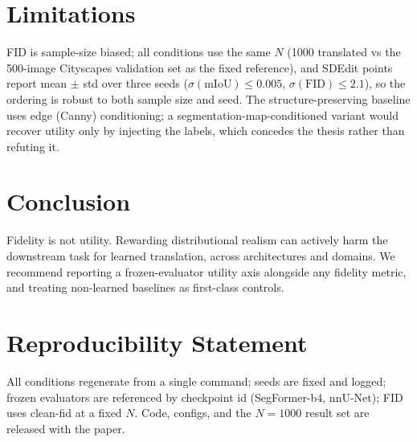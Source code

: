 \documentclass{article}
\begin{document}
\section{Limitations}
FID is sample-size biased; all conditions use the same $N$ (1000 translated vs the
500-image Cityscapes validation set as the fixed reference), and SDEdit points
report mean $\pm$ std over three seeds ($\sigma(\text{mIoU})\le0.005$,
$\sigma(\text{FID})\le2.1$), so the ordering is robust to both sample size and
seed. The structure-preserving baseline uses edge (Canny) conditioning; a
segmentation-map-conditioned variant would recover utility only by injecting the
labels, which concedes the thesis rather than refuting it.

\section{Conclusion}
Fidelity is not utility. Rewarding distributional realism can actively harm the
downstream task for learned translation, across architectures and domains. We
recommend reporting a frozen-evaluator utility axis alongside any fidelity metric,
and treating non-learned baselines as first-class controls.

\section*{Reproducibility Statement}
All conditions regenerate from a single command; seeds are fixed and logged; frozen
evaluators are referenced by checkpoint id (SegFormer-b4, nnU-Net); FID uses
clean-fid at a fixed $N$. Code, configs, and the $N{=}1000$ result set are released
with the paper.



\end{document}

